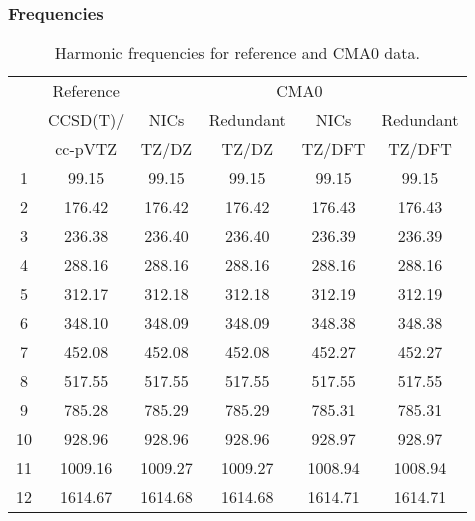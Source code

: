 \documentclass[10pt,oneside]{article}
\begin{document}
\begin{table}[h!]
\subsubsection*{Frequencies}
\centering
\caption{Harmonic frequencies for reference and CMA0 data.}
\begin{tabular}{cccccc}
\toprule
{} & Reference & \multicolumn{4}{c}{CMA0} \\
{} &  CCSD(T)/ &    NICs &  Redundant &    NICs & Redundant \\
{} &   cc-pVTZ &   TZ/DZ &      TZ/DZ &  TZ/DFT &    TZ/DFT \\
\midrule
1  &     99.15 &   99.15 &      99.15 &   99.15 &     99.15 \\
2  &    176.42 &  176.42 &     176.42 &  176.43 &    176.43 \\
3  &    236.38 &  236.40 &     236.40 &  236.39 &    236.39 \\
4  &    288.16 &  288.16 &     288.16 &  288.16 &    288.16 \\
5  &    312.17 &  312.18 &     312.18 &  312.19 &    312.19 \\
6  &    348.10 &  348.09 &     348.09 &  348.38 &    348.38 \\
7  &    452.08 &  452.08 &     452.08 &  452.27 &    452.27 \\
8  &    517.55 &  517.55 &     517.55 &  517.55 &    517.55 \\
9  &    785.28 &  785.29 &     785.29 &  785.31 &    785.31 \\
10 &    928.96 &  928.96 &     928.96 &  928.97 &    928.97 \\
11 &   1009.16 & 1009.27 &    1009.27 & 1008.94 &   1008.94 \\
12 &   1614.67 & 1614.68 &    1614.68 & 1614.71 &   1614.71 \\
\bottomrule
\end{tabular}
\end{table}
\end{document}

